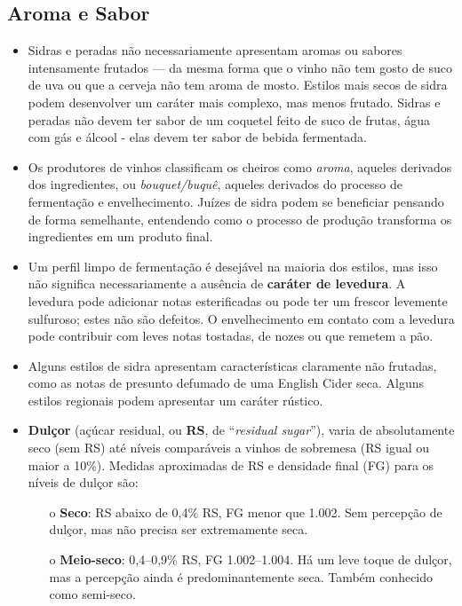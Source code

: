 \subsection*{Aroma e Sabor}

\begin{itemize}
\item Sidras e peradas não necessariamente apresentam aromas ou sabores intensamente frutados — da mesma forma que o vinho não tem gosto de suco de uva ou que a cerveja não tem aroma de mosto. Estilos mais secos de sidra podem desenvolver um caráter mais complexo, mas menos frutado. Sidras e peradas não devem ter sabor de um coquetel feito de suco de frutas, água com gás e álcool - elas devem ter sabor de bebida fermentada.
\item Os produtores de vinhos classificam os cheiros como \textit{aroma}, aqueles derivados dos ingredientes, ou \textit{bouquet/buquê}, aqueles derivados do processo de fermentação e envelhecimento. Juízes de sidra podem se beneficiar pensando de forma semelhante, entendendo como o processo de produção transforma os ingredientes em um produto final.
\item Um perfil limpo de fermentação é desejável na maioria dos estilos, mas isso não significa necessariamente a ausência de \textbf{caráter de levedura}. A levedura pode adicionar notas esterificadas ou pode ter um frescor levemente sulfuroso; estes não são defeitos. O envelhecimento em contato com a levedura pode contribuir com leves notas tostadas, de nozes ou que remetem a pão.
\item Alguns estilos de sidra apresentam características claramente não frutadas, como as notas de presunto defumado de uma English Cider seca. Alguns estilos regionais podem apresentar um caráter rústico.
\item \textbf{Dulçor} (açúcar residual, ou \textbf{RS}, de “\textit{residual sugar}”), varia de absolutamente seco (sem RS) até níveis comparáveis a vinhos de sobremesa (RS igual ou maior a 10\%). Medidas aproximadas de RS e densidade final (FG) para os níveis de dulçor são:
  \begin{itemize}
  \item[o] \textbf{Seco}: RS abaixo de 0,4\% RS, FG menor que 1.002. Sem percepção de dulçor, mas não precisa ser extremamente seca.
  \item[o] \textbf{Meio-seco}: 0,4–0,9\% RS, FG 1.002–1.004. Há um leve toque de dulçor, mas a percepção ainda é predominantemente seca. Também conhecido como semi-seco.

\end{itemize}
\end{itemize}
